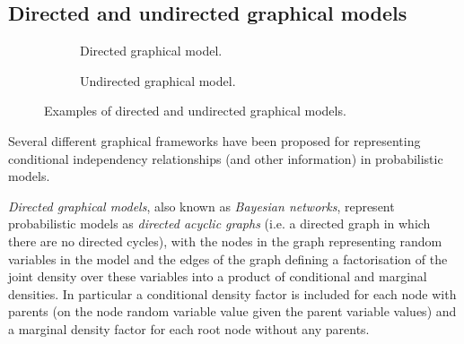 
\subsection{Directed and undirected graphical models}

\begin{figure}[!h]
\centering
\begin{subfigure}[b]{.5\linewidth}
\vskip 0pt
\centering
{}
\caption{Directed graphical model.}
\label{sfig:example-directed-graphical-model}
\end{subfigure}%
\begin{subfigure}[b]{.5\linewidth}
\vskip 0pt
\centering
{}
\caption{Undirected graphical model.}
\label{sfig:example-undirected-graphical-model}
\end{subfigure}%
\caption[Directed and undirected graphical models.]{Examples of directed and undirected graphical models.}%
\label{fig:example-graphical-models}
\end{figure}

Several different graphical frameworks have been proposed for representing conditional independency relationships (and other information) in probabilistic models. 

\emph{Directed graphical models}\citep{}, also known as \emph{Bayesian networks}, represent probabilistic models as \emph{directed acyclic graphs} (i.e. a directed graph in which there are no directed cycles), with the nodes in the graph representing random variables in the model and the edges of the graph defining a factorisation of the joint density over these variables into a product of conditional and marginal densities. In particular a conditional density factor is included for each node with parents (on the node random variable value given the parent variable values) and a marginal density factor for each root node without any parents.

